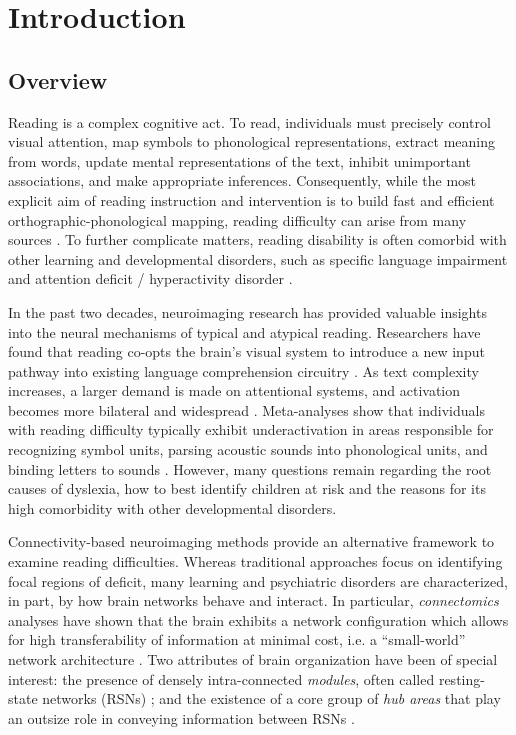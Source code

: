 \chapter{Introduction}

\section{Overview}
Reading is a complex cognitive act. To read, individuals must precisely control visual attention, map symbols to phonological representations, extract meaning from words, update mental representations of the text, inhibit unimportant associations, and make appropriate inferences. Consequently, while the most explicit aim of reading instruction and intervention is to build fast and efficient orthographic-phonological mapping, reading difficulty can arise from many sources \cite{Pennington2009, vanderLely2010}. To further complicate matters, reading disability is often comorbid with other learning and developmental disorders, such as specific language impairment and attention deficit / hyperactivity disorder \cite{Pennington2006, Margari2013}.

In the past two decades, neuroimaging research has provided valuable insights into the neural mechanisms of typical and atypical reading. Researchers have found that reading co-opts the brain's visual system to introduce a new input pathway into existing language comprehension circuitry \cite{Jobard2007}. As text complexity increases, a larger demand is made on attentional systems, and activation becomes more bilateral and widespread \cite{Xu2005}.  Meta-analyses show that individuals with reading difficulty typically exhibit underactivation in areas responsible for recognizing symbol units, parsing acoustic sounds into phonological units, and binding letters to sounds \cite{Maisog2008, Richlan2009, Paulesu2014}. However, many questions remain regarding the root causes of dyslexia, how to best identify children at risk and the reasons for its high comorbidity with other developmental disorders. 

Connectivity-based neuroimaging methods provide an alternative framework to examine reading difficulties. Whereas traditional  approaches focus on identifying focal regions of deficit, many learning and psychiatric disorders are characterized, in part, by how brain networks behave and interact. In particular, \textit{connectomics} analyses have shown that the brain exhibits a network configuration which allows for high transferability of information at minimal cost, i.e. a “small-world” network architecture \cite{Bullmore2012}. Two attributes of brain organization have been of special interest: the presence of densely intra-connected \textit{modules}, often called resting-state networks (RSNs) \cite{Sporns2016}; and the existence of a core group of \textit{hub areas} that play an outsize role in conveying information between RSNs \cite{VandenHeuvel2011}. 

